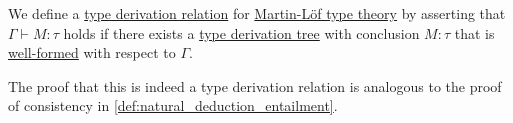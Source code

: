 \begin{definition}\label{def:mltt_entailment}\mimprovised
  We define a \hyperref[def:type_derivation_relation]{type derivation relation} for \hyperref[def:mltt]{Martin-L\"of type theory} by asserting that \( \Gamma \vdash M: \tau \) holds if there exists a \hyperref[def:type_derivation_tree]{type derivation tree} with conclusion \( M: \tau \) that is \hyperref[def:mltt_well_formed_context/derivation]{well-formed} with respect to \( \Gamma \).
\end{definition}
\begin{comments}
  \item The proof that this is indeed a type derivation relation is analogous to the proof of consistency in \cref{def:natural_deduction_entailment}.
\end{comments}

